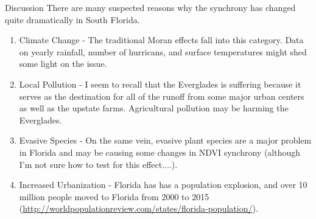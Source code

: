 \documentclass[11pt,reqno, twoside]{amsart}
\makeatletter
\renewcommand\subsection{\@startsection{subsection}{2}%
  \z@{-0.8\linespacing\@plus-0.7\linespacing}{0.7\linespacing}%
  {\normalfont\bfseries}}
\theoremstyle{plain}  %
\theoremstyle{definition}
\numberwithin{figure}{section}
\numberwithin{equation}{section}
\makeatother
\begin{document}
\subsection{Discussion}
There are many suspected reasons why the synchrony has changed quite dramatically in South Florida.
\begin{enumerate}
    \item Climate Change - The traditional Moran effects fall into this category. Data on yearly rainfall, number of hurricans, and surface temperatures might shed some light on the issue.\\
    \item Local Pollution - I seem to recall that the Everglades is suffering because it serves as the destination for all of the runoff from some major urban centers as well as the upstate farms. Agricultural pollution may be harming the Everglades.\\
    \item Evasive Species - On the same vein, evasive plant species are a major problem in Florida and may be causing some changes in NDVI synchrony (although I'm not sure how to test for this effect....).\\
    \item Increased Urbanization - Florida has has a population explosion, and over 10 million people moved to Florida from 2000 to 2015 (\url{http://worldpopulationreview.com/states/florida-population/}).
\end{enumerate}
\end{document}
